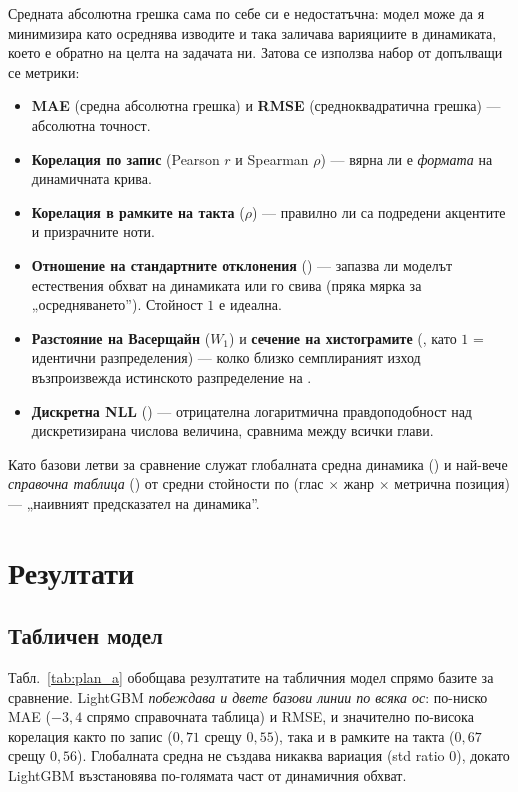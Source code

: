 Средната абсолютна грешка сама по себе си е недостатъчна: модел може да я
минимизира като осреднява изводите и така заличава варияциите в динамиката,
което е обратно на целта на задачата ни. Затова се използва набор от
допълващи се метрики:
\begin{itemize}
  \item \textbf{MAE} (средна абсолютна грешка) и \textbf{RMSE} (средноквадратична грешка) — абсолютна точност.
  \item \textbf{Корелация по запис} (Pearson $r$ и Spearman $\rho$) — вярна ли е
        \emph{формата} на динамичната крива.
  \item \textbf{Корелация в рамките на такта} ($\rho$) — правилно ли са подредени
        акцентите и призрачните ноти.
  \item \textbf{Отношение на стандартните отклонения} () — запазва
        ли моделът естествения обхват на динамиката или го свива (пряка мярка за
        „осредняването''). Стойност $1$ е идеална.
  \item \textbf{Разстояние на Васерщайн} ($W_1$) и \textbf{сечение на хистограмите}
        (, като $1$ = идентични разпределения) — колко близко семплираният
        изход възпроизвежда истинското разпределение на .
  \item \textbf{Дискретна NLL} () — отрицателна логаритмична
        правдоподобност над дискретизирана числова величина, сравнима между всички глави.
\end{itemize}
Като базови летви за сравнение служат глобалната средна динамика () и
най-вече \emph{справочна таблица} () от средни стойности по
(глас $\times$ жанр $\times$ метрична позиция) — „наивният предсказател на динамика''.

\section{Резултати}
\label{sec:rezultati}

\subsection{Табличен модел}
\label{sec:rez-a}

Табл.~\ref{tab:plan_a} обобщава резултатите на табличния модел спрямо базите за сравнение.
LightGBM \emph{побеждава и двете базови линии по всяка ос}: по-ниско MAE
($-3{,}4$ спрямо справочната таблица) и RMSE, и значително по-висока корелация
както по запис ($0{,}71$ срещу $0{,}55$), така и в рамките на такта ($0{,}67$
срещу $0{,}56$). Глобалната средна не създава никаква вариация (std ratio $0$),
докато LightGBM възстановява по-голямата част от динамичния обхват.


